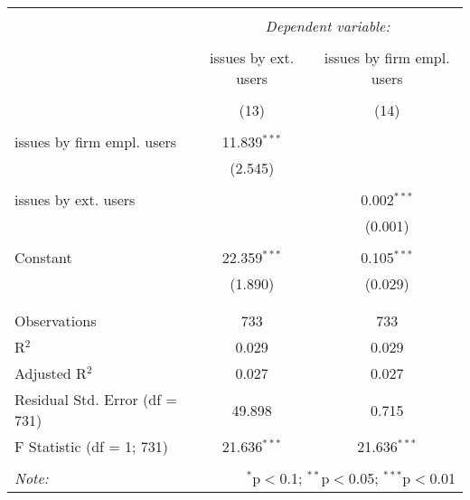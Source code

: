
\begin{tabular}{@{\extracolsep{5pt}}lcc}
\\[-1.8ex]\hline
\hline \\[-1.8ex]
 & \multicolumn{2}{c}{\textit{Dependent variable:}} \\
\cline{2-3}
\\[-1.8ex] & issues by ext. users & issues by firm empl. users \\
\\[-1.8ex] & (13) & (14)\\ 
\hline \\[-1.8ex]
 issues by firm empl. users & 11.839$^{***}$ &  \\
  & (2.545) &  \\
  & & \\
 issues by ext. users &  & 0.002$^{***}$ \\
  &  & (0.001) \\
  & & \\
 Constant & 22.359$^{***}$ & 0.105$^{***}$ \\
  & (1.890) & (0.029) \\
  & & \\
\hline \\[-1.8ex]
Observations & 733 & 733 \\
R$^{2}$ & 0.029 & 0.029 \\
Adjusted R$^{2}$ & 0.027 & 0.027 \\
Residual Std. Error (df = 731) & 49.898 & 0.715 \\
F Statistic (df = 1; 731) & 21.636$^{***}$ & 21.636$^{***}$ \\
\hline
\hline \\[-1.8ex]
\textit{Note:}  & \multicolumn{2}{r}{$^{*}$p$<$0.1; $^{**}$p$<$0.05; $^{***}$p$<$0.01} \\
\end{tabular}

